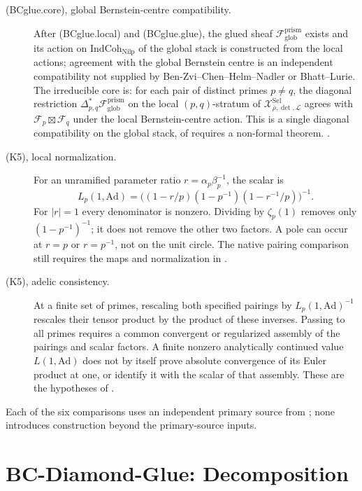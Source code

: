 \begin{description}
\item[(BCglue.core), global Bernstein-centre compatibility.] After
(BCglue.local) and (BCglue.glue), the glued sheaf
\(\mathcal{F}_{\mathrm{glob}}^{\mathrm{prism}}\) exists and its action
on \(\mathrm{IndCoh}_{\mathrm{Nilp}}\) of the global stack is
constructed from the local actions; agreement with the
global Bernstein centre is an independent compatibility not
supplied by Ben-Zvi--Chen--Helm--Nadler or Bhatt--Lurie. The
irreducible core is: for each pair of distinct primes \(p\neq q\),
the diagonal restriction
\(\Delta^{*}_{p,q}\mathcal{F}_{\mathrm{glob}}^{\mathrm{prism}}\)
on the local \((p,q)\)-stratum of
\(\mathcal{X}^{\mathrm{Sel}}_{\bar\rho,\det,\mathcal{L}}\) agrees with
\(\mathcal{F}_{p}\boxtimes\mathcal{F}_{q}\) under the local
Bernstein-centre action. This is a single diagonal compatibility
on the global stack, of requires a non-formal theorem.
.

\item[(K5), local normalization.] For an unramified parameter ratio
\(r=\alpha_p\beta_p^{-1}\), the scalar is
\[
 L_p(1,\mathrm{Ad})
 =\bigl((1-r/p)(1-p^{-1})(1-r^{-1}/p)\bigr)^{-1}.
\]
For \(|r|=1\) every denominator is nonzero. Dividing by
\(\zeta_p(1)\) removes only \((1-p^{-1})^{-1}\); it does not
remove the other two factors. A pole can occur at \(r=p\) or
\(r=p^{-1}\), not on the unit circle. The native pairing comparison
still requires the maps and normalization in
.

\item[(K5), adelic consistency.] At a finite set of primes, rescaling
both specified pairings by \(L_p(1,\mathrm{Ad})^{-1}\) rescales
their tensor product by the product of these inverses. Passing to all
primes requires a common convergent or regularized assembly of the
pairings and scalar factors. A finite nonzero analytically continued
value \(L(1,\mathrm{Ad})\) does not by itself prove absolute
convergence of its Euler product at one, or identify it with the
scalar of that assembly. These are the hypotheses of
.
\end{description}

Each of the six comparisons uses an independent primary source from
; none introduces construction beyond
the primary-source inputs.

\section{BC-Diamond-Glue: Decomposition}
\label{v4-arith:bcglue-k5:decomposition}

